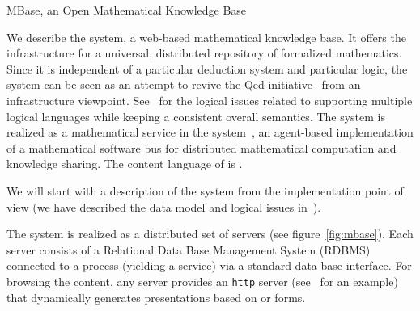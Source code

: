 
\begin{omgroup}[id=mbase,short=MBase,creators={miko,afranke}]
{MBase, an Open Mathematical Knowledge Base}

We describe the {\mbase} system, a web-based mathematical knowledge base. It offers the
infrastructure for a universal, distributed repository of formalized mathematics. Since it
is independent of a particular deduction system and particular logic, the {\mbase} system
can be seen as an attempt to revive the {\sc Qed} initiative~\cite{qed} from an infrastructure
viewpoint. See~\cite{KohFra:rkcimss01} for the logical issues related to supporting
multiple logical languages while keeping a consistent overall semantics. The system is
realized as a mathematical service in the {\mathweb}
system~\cite{FraKoh:mabdl99,ZimmerMICAI04}, an agent-based implementation of a
mathematical software bus for distributed mathematical computation and knowledge
sharing. The content language of {\mbase} is {\omdoc}.

We will start with a description of the system from the implementation point of
view (we have described the data model and logical issues
in~\cite{KohFra:rkcimss01}).  

The {\mbase} system is realized as a distributed set of {\mbase} servers (see
figure~\ref{fig:mbase}). Each {\mbase} server consists of a Relational Data Base
Management System (RDBMS) connected to a {\mozart} process (yielding a {\mathweb} service)
via a standard data base interface.  For browsing the {\mbase} content, any {\mbase}
server provides an {\tt http} server (see~\cite{MBase-Demo:URL} for an example) that
dynamically generates presentations based on {\html} or {\xml} forms.


\end{omgroup}
